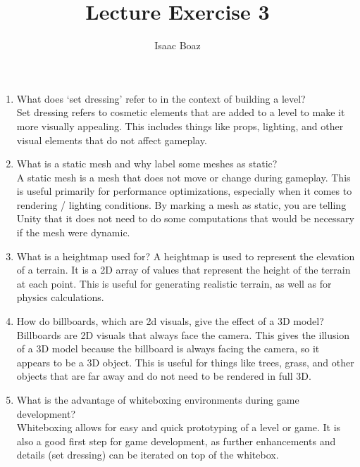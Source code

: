 \documentclass{article}
\title{Lecture Exercise 3}
\author{Isaac Boaz}
\begin{document}
\maketitle

\begin{enumerate}
    \item What does `set dressing' refer to in the context of building a level? \\
          Set dressing refers to cosmetic elements that are added to a level to
          make it more visually appealing. This includes things like props,
          lighting, and other visual elements that do not affect gameplay.
    \item What is a static mesh and why label some meshes as static? \\
          A static mesh is a mesh that does not move or change during gameplay.
          This is useful primarily for performance optimizations, especially
          when it comes to rendering / lighting conditions.
          By marking a mesh as static, you are telling Unity that it does not
          need to do some computations that would be necessary if the mesh were
          dynamic.
    \item What is a heightmap used for?
          A heightmap is used to represent the elevation of a terrain. It is a
          2D array of values that represent the height of the terrain at each
          point. This is useful for generating realistic terrain, as well as
          for physics calculations.
    \item How do billboards, which are 2d visuals, give the effect of a 3D
          model? \\
          Billboards are 2D visuals that always face the camera. This
          gives the illusion of a 3D model because the billboard is always
          facing the camera, so it appears to be a 3D object. This is useful
          for things like trees, grass, and other objects that are far away
          and do not need to be rendered in full 3D.
    \item What is the advantage of whiteboxing environments during game
          development? \\
          Whiteboxing allows for easy and quick prototyping of a level or
          game. It is also a good first step for game development, as further
          enhancements and details (set dressing) can be iterated on top of the
          whitebox.
\end{enumerate}
\end{document}
